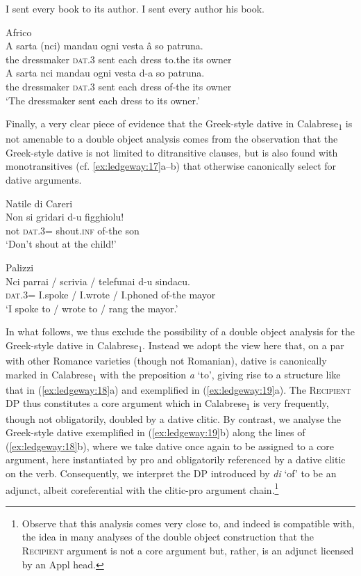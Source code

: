 \documentclass[output=paper,modfonts,nonflat,colorlinks,citecolor=brown]{langsci/langscibook}
\begin{document}
\ea\label{ex:ledgeway:15}
\ea I sent every book to its author.  
\ex I sent every author his book.
\z
\z

\ea\label{ex:ledgeway:16}
  Africo\\
\ea
	\gll A  sarta  (nci)  mandau  ogni  vesta  â  so patruna.\\
      the  dressmaker  \textsc{dat}.3  sent  each  dress  to.the  its  owner\\
\ex
	\gll A  sarta  nci  mandau  ogni  vesta  d-a  so patruna.\\
      the  dressmaker  \textsc{dat}.3  sent  each  dress  of-the  its     owner\\
      \glt `The dressmaker sent each dress to its owner.'
      \z
      \z

Finally, a very clear piece of evidence that the Greek-style dative in Calabrese\textsubscript{1} is not amenable to a double object analysis comes from the observation that the Greek-style dative is not limited to ditransitive clauses, but is also found with monotransitives (cf. \ref{ex:ledgeway:17}a--b) that otherwise canonically select for dative arguments.

\ea\label{ex:ledgeway:17}
\ea Natile di Careri\\
 \gll Non  si  gridari  d-u  figghiolu!\\
    not  \textsc{dat}.3=  shout.\textsc{inf}  of-the  son\\
     \glt `Don’t shout at the child!'

\ex Palizzi  \\
    \gll Nci  parrai / scrivia / telefunai d-u sindacu.\\
    \textsc{dat}.3= I.spoke / I.wrote / I.phoned of-the mayor\\
    \glt `I spoke to / wrote to / rang the mayor.'
    \z
    \z

In what follows, we thus exclude the possibility of a double object analysis for the Greek-style dative in Calabrese\textsubscript{1}. Instead we adopt the view here that, on a par with other Romance varieties (though not Romanian), dative is canonically marked in Calabrese\textsubscript{1} with the preposition \textit{a} ‘to’, giving rise to a structure like that in (\ref{ex:ledgeway:18}a) and exemplified in (\ref{ex:ledgeway:19}a). The \textsc{Recipient} DP thus constitutes a core argument which in Calabrese\textsubscript{1} is very frequently, though not obligatorily, doubled by a dative clitic. By contrast, we analyse the Greek-style dative exemplified in (\ref{ex:ledgeway:19}b) along the lines of (\ref{ex:ledgeway:18}b), where we take dative once again to be assigned to a core argument, here instantiated by pro and obligatorily referenced by a dative clitic on the verb. Consequently, we interpret the DP introduced by \textit{di} ‘of’ to be an adjunct, albeit coreferential with the clitic-pro argument chain.\footnote{Observe that this analysis comes very close to, and indeed is compatible with, the idea in many analyses of the double object construction that the \textsc{Recipient} argument is not a core argument but, rather, is an adjunct licensed by an Appl head.} 
\end{document}
